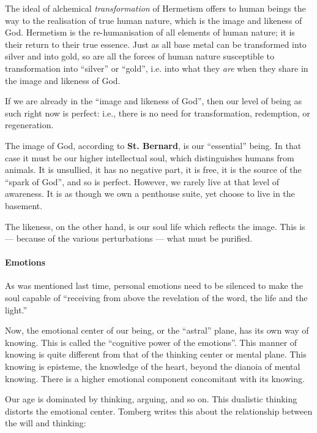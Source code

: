 \begin{quotationx}
The ideal of alchemical \emph{transformation} of Hermetism offers to human beings the way to the realisation of true
human nature, which is the image and likeness of God. Hermetism is the re-humanisation of all elements of human nature;
it is their return to their true essence. Just as all base metal can be transformed into silver and into gold, so are
all the forces of human nature susceptible to transformation into “silver” or “gold”, i.e. into what they \emph{are}
when they share in the image and likeness of God. 

\end{quotationx}
If we are already in the “image and likeness of God”, then our level of being as such right now is perfect: i.e., there
is no need for transformation, redemption, or regeneration.

The image of God, according to \textbf{St. Bernard}, is our “essential” being. In that case it must be our higher
intellectual soul, which distinguishes humans from animals. It is unsullied, it has no negative part, it is free, it is
the source of the “spark of God”, and so is perfect. However, we rarely live at that level of awareness. It is as
though we own a penthouse suite, yet choose to live in the basement.

The likeness, on the other hand, is our soul life which reflects the image. This is — because of
the various perturbations — what must be purified.

\paragraph{Emotions}
As was mentioned last time, personal emotions need to be silenced to make the soul capable of “receiving from above the
revelation of the word, the life and the light.”

Now, the emotional center of our being, or the “astral” plane, has its own way of knowing. This is called the “cognitive
power of the emotions”. This manner of knowing is quite different from that of the thinking center or mental plane.
This knowing is episteme, the knowledge of the heart, beyond the dianoia of mental knowing. There is a higher emotional
component concomitant with its knowing.

Our age is dominated by thinking, arguing, and so on. This dualistic thinking distorts the emotional center. Tomberg
writes this about the relationship between the will and thinking:

